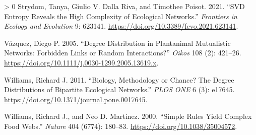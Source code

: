 \documentclass[10pt,oneside]{article}
\newlength{\cslhangindent}
\newenvironment{CSLReferences}[3] %
 {%
  \setlength{\parindent}{0pt}
  \ifodd #1 \everypar{\setlength{\hangindent}{\cslhangindent}}\ignorespaces\fi
  \ifnum #2 > 0
  \setlength{\parskip}{#2\baselineskip}
  \fi
 }%
 {}
\begin{document}
\begin{CSLReferences}{1}{0}
\leavevmode\hypertarget{ref-Strydom2021SvdEnt}{}%
Strydom, Tanya, Giulio V. Dalla Riva, and Timothee Poisot. 2021. {``SVD
Entropy Reveals the High Complexity of Ecological Networks.''}
\emph{Frontiers in Ecology and Evolution} 9: 623141.
\url{https://doi.org/10.3389/fevo.2021.623141}.

\leavevmode\hypertarget{ref-Vazquez2005DegDisa}{}%
Vázquez, Diego P. 2005. {``Degree Distribution in Plantanimal
Mutualistic Networks: Forbidden Links or Random Interactions?''}
\emph{Oikos} 108 (2): 421--26.
\url{https://doi.org/10.1111/j.0030-1299.2005.13619.x}.

\leavevmode\hypertarget{ref-Williams2011BioMet}{}%
Williams, Richard J. 2011. {``Biology, Methodology or Chance? The Degree
Distributions of Bipartite Ecological Networks.''} \emph{PLOS ONE} 6
(3): e17645. \url{https://doi.org/10.1371/journal.pone.0017645}.

\leavevmode\hypertarget{ref-Williams2000SimRul}{}%
Williams, Richard J., and Neo D. Martinez. 2000. {``Simple Rules Yield
Complex Food Webs.''} \emph{Nature} 404 (6774): 180--83.
\url{https://doi.org/10.1038/35004572}.

\end{CSLReferences}
\end{document}
